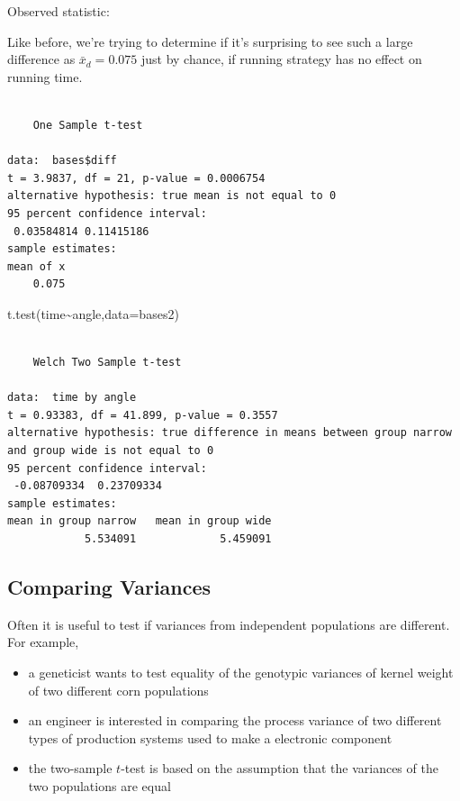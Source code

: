 \documentclass[
  letterpaper,
  DIV=11,
  numbers=noendperiod]{scrartcl}
\newenvironment{Shaded}{\begin{snugshade}}{\end{snugshade}}
\newcommand{\AttributeTok}[1]{\textcolor[rgb]{0.40,0.45,0.13}{#1}}
\newcommand{\FunctionTok}[1]{\textcolor[rgb]{0.28,0.35,0.67}{#1}}
\newcommand{\NormalTok}[1]{\textcolor[rgb]{0.00,0.23,0.31}{#1}}
\newcommand{\SpecialCharTok}[1]{\textcolor[rgb]{0.37,0.37,0.37}{#1}}
\begin{document}
Observed statistic:

Like before, we're trying to determine if it's surprising to see such a
large difference as \(\bar x_d = 0.075\) just by chance, if running
strategy has no effect on running time.

\begin{Shaded}
\end{Shaded}

\begin{verbatim}

    One Sample t-test

data:  bases$diff
t = 3.9837, df = 21, p-value = 0.0006754
alternative hypothesis: true mean is not equal to 0
95 percent confidence interval:
 0.03584814 0.11415186
sample estimates:
mean of x 
    0.075 
\end{verbatim}

\begin{Shaded}
\begin{Highlighting}[]
\FunctionTok{t.test}\NormalTok{(time}\SpecialCharTok{\textasciitilde{}}\NormalTok{angle,}\AttributeTok{data=}\NormalTok{bases2)}
\end{Highlighting}
\end{Shaded}

\begin{verbatim}

    Welch Two Sample t-test

data:  time by angle
t = 0.93383, df = 41.899, p-value = 0.3557
alternative hypothesis: true difference in means between group narrow and group wide is not equal to 0
95 percent confidence interval:
 -0.08709334  0.23709334
sample estimates:
mean in group narrow   mean in group wide 
            5.534091             5.459091 
\end{verbatim}

\subsection{Comparing Variances}\label{comparing-variances}

Often it is useful to test if variances from independent populations are
different. For example,

\begin{itemize}
\item
  a geneticist wants to test equality of the genotypic variances of
  kernel weight of two different corn populations
\item
  an engineer is interested in comparing the process variance of two
  different types of production systems used to make a electronic
  component
\item
  the two-sample \(t\)-test is based on the assumption that the
  variances of the two populations are equal
\end{itemize}
\end{document}
